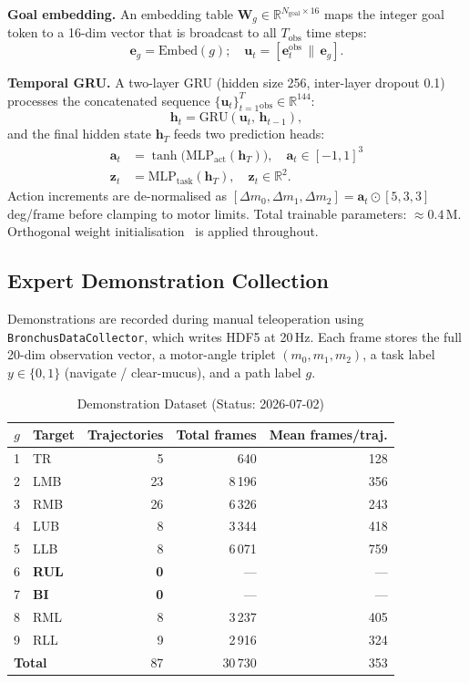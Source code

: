 \documentclass[journal,comsoc]{IEEEtran}
\newcommand{\Tobs}{T_{\text{obs}}}
\newcommand{\Ngoal}{N_{\text{goal}}}
\newcommand{\act}{\mathbf{a}}
\newcommand{\hid}{\mathbf{h}}
\newcommand{\goal}{g}
\newcommand{\embg}{\mathbf{e}_{g}}
\begin{document}
\textbf{Goal embedding.}
An embedding table $\mathbf{W}_g \in \mathbb{R}^{\Ngoal \times 16}$
maps the integer goal token to a 16-dim vector that is broadcast to
all $\Tobs$ time steps:
\begin{equation}
  \embg = \text{Embed}(\goal);\quad
  \mathbf{u}_t = [\mathbf{e}^{\text{obs}}_t \,\|\, \embg].
  \label{eq:goal_emb}
\end{equation}

\textbf{Temporal GRU.}
A two-layer GRU (hidden size 256, inter-layer dropout 0.1) processes
the concatenated sequence $\{\mathbf{u}_t\}_{t=1}^\Tobs \in
\mathbb{R}^{144}$:
\begin{equation}
  \hid_t = \text{GRU}(\mathbf{u}_t,\, \hid_{t-1}),
  \label{eq:gru}
\end{equation}
and the final hidden state $\hid_T$ feeds two prediction heads:
\begin{align}
  \act_t &= \tanh\!\bigl(\text{MLP}_\text{act}(\hid_T)\bigr),
            \quad \act_t\!\in\![-1,1]^3 \label{eq:action_head}\\
  \mathbf{z}_t &= \text{MLP}_\text{task}(\hid_T),
            \quad \mathbf{z}_t\!\in\!\mathbb{R}^2.   \label{eq:task_head}
\end{align}
Action increments are de-normalised as
$[\Delta m_0, \Delta m_1, \Delta m_2] = \act_t \odot [5, 3, 3]$\,deg/frame
before clamping to motor limits. Total trainable parameters:
$\approx 0.4$\,M. Orthogonal weight initialisation~\cite{zhao2023act}
is applied throughout.

\subsection{Expert Demonstration Collection}
Demonstrations are recorded during manual teleoperation using
\texttt{BronchusDataCollector}, which writes HDF5 at 20\,Hz. Each
frame stores the full 20-dim observation vector, a motor-angle
triplet $(m_0, m_1, m_2)$, a task label $y\!\in\!\{0,1\}$
(navigate / clear-mucus), and a path label $\goal$.

\begin{table}[h]
\caption{Demonstration Dataset (Status: 2026-07-02)}
\label{tab:demos}
\centering
\small
\begin{tabular}{clrrr}
\toprule
$\goal$ & Target & Trajectories & Total frames & Mean frames/traj. \\
\midrule
1 & TR  & 5  & 640    & 128 \\
2 & LMB & 23 & 8\,196 & 356 \\
3 & RMB & 26 & 6\,326 & 243 \\
4 & LUB & 8  & 3\,344 & 418 \\
5 & LLB & 8  & 6\,071 & 759 \\
6 & \textbf{RUL} & \textbf{0} & --- & --- \\
7 & \textbf{BI}  & \textbf{0} & --- & --- \\
8 & RML & 8  & 3\,237 & 405 \\
9 & RLL & 9  & 2\,916 & 324 \\
\midrule
\multicolumn{2}{l}{\textbf{Total}} & 87 & 30\,730 & 353 \\
\bottomrule
\end{tabular}
\end{table}
\end{document}
